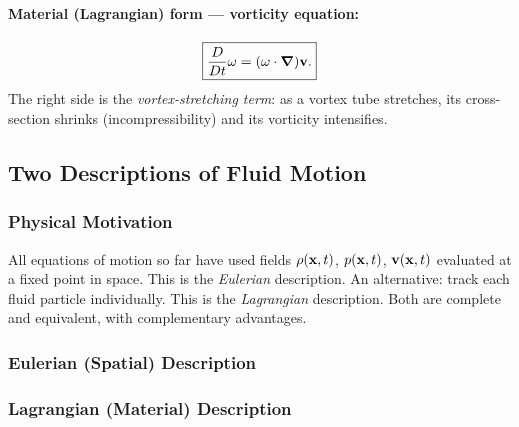 \documentclass[../main.tex]{subfiles}
\begin{document}
\paragraph{Material (Lagrangian) form — vorticity equation:}
\begin{equation}
  \boxed{\frac{D}{Dt}\mathbf{\omega} = (\mathbf{\omega}\cdot\grad)\mathbf{v}.}
  \label{eq:lec14_kelvin_material}
\end{equation}
The right side is the \emph{vortex-stretching term}: as a vortex tube stretches, its cross-section shrinks (incompressibility) and its vorticity intensifies.


\subsection{Two Descriptions of Fluid Motion}\label{sec:lec14:descriptions}

\subsubsection*{Physical Motivation}
All equations of motion so far have used fields $\rho(\mathbf{x},t)$, $p(\mathbf{x},t)$, $\mathbf{v}(\mathbf{x},t)$ evaluated at a fixed point in space. This is the \emph{Eulerian} description. An alternative: track each fluid particle individually. This is the \emph{Lagrangian} description. Both are complete and equivalent, with complementary advantages.

\subsubsection{Eulerian (Spatial) Description}


\subsubsection{Lagrangian (Material) Description}
\end{document}
